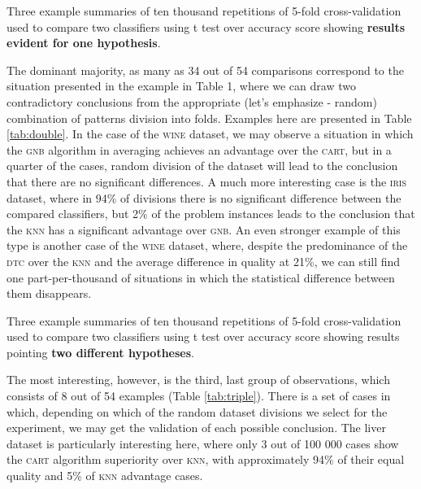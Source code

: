 \documentclass[final,3p,times,onecolumn]{elsarticle}
\begin{document}
\begin{table}[!h]
	\centering
	\caption{Three example summaries of ten thousand repetitions of 5-fold cross-validation used to compare two classifiers using t test over accuracy score showing \textbf{results evident for one hypothesis}.}
	\label{tab:single}
	\hspace{.03\textwidth}%
	\hspace{.03\textwidth}%
	
\end{table}


The dominant majority, as many as 34 out of 54 comparisons correspond to the situation presented in the example in Table 1, where we can draw two contradictory conclusions from the appropriate (let's emphasize - random) combination of patterns division into folds. Examples here are presented in Table \ref{tab:double}. In the case of the \textsc{wine} dataset, we may observe a situation in which the \textsc{gnb} algorithm in averaging achieves an advantage over the \textsc{cart}, but in a quarter of the cases, random division of the dataset will lead to the conclusion that there are no significant differences. A much more interesting case is the \textsc{iris} dataset, where in 94\% of divisions there is no significant difference between the compared classifiers, but 2\% of the problem instances leads to the conclusion that the \textsc{knn} has a significant advantage over \textsc{gnb}. An even stronger example of this type is another case of the \textsc{wine} dataset, where, despite the predominance of the \textsc{dtc} over the \textsc{knn} and the average difference in quality at 21\%, we can still find one part-per-thousand of situations in which the statistical difference between them disappears.

\begin{table}[!h]
	\centering
	\caption{Three example summaries of ten thousand repetitions of 5-fold cross-validation used to compare two classifiers using t test over accuracy score showing results pointing \textbf{two different hypotheses}.}

	\label{tab:double}

	\hspace{.03\textwidth}%
	\hspace{.03\textwidth}%
	
\end{table}

The most interesting, however, is the third, last group of observations, which consists of 8 out of 54 examples (Table \ref{tab:triple}). There is a set of cases in which, depending on which of the random dataset divisions we select for the experiment, we may get the validation of each possible conclusion. The liver dataset is particularly interesting here, where only 3 out of 100 000 cases show the \textsc{cart} algorithm superiority over \textsc{knn}, with approximately 94\% of their equal quality and 5\% of \textsc{knn} advantage cases.
\end{document}
